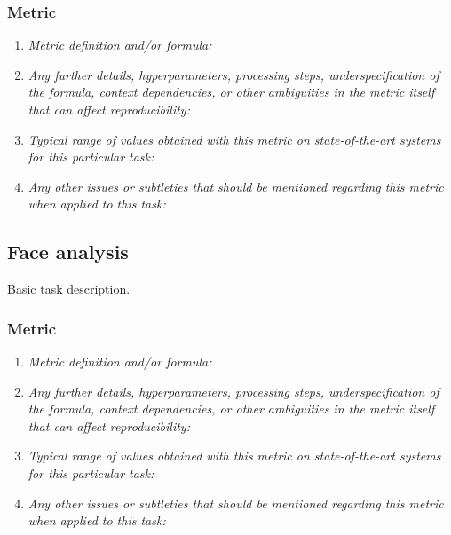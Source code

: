\documentclass[a4paper,11pt]{article}
\begin{document}
        \subsubsection{Metric}
            \begin{enumerate}[label=\alph*.]
                \item \textit{Metric definition and/or formula:}
                \bigskip
                \item \textit{Any further details, hyperparameters, processing steps, underspecification of the formula, context dependencies, or other ambiguities in the metric itself that can affect reproducibility:}
                \bigskip
                \item \textit{Typical range of values obtained with this metric on state-of-the-art systems for this particular task:}
                \bigskip
                \item \textit{Any other issues or subtleties that should be mentioned regarding this metric when applied to this task:}
                \bigskip
            \end{enumerate}

    \subsection{Face analysis} \label{face_analysis}
        Basic task description.
        \subsubsection{Metric}
            \begin{enumerate}[label=\alph*.]
                \item \textit{Metric definition and/or formula:}
                \bigskip
                \item \textit{Any further details, hyperparameters, processing steps, underspecification of the formula, context dependencies, or other ambiguities in the metric itself that can affect reproducibility:}
                \bigskip
                \item \textit{Typical range of values obtained with this metric on state-of-the-art systems for this particular task:}
                \bigskip
                \item \textit{Any other issues or subtleties that should be mentioned regarding this metric when applied to this task:}
                \bigskip
            \end{enumerate}
\end{document}

